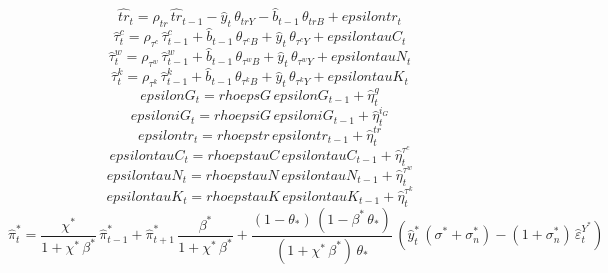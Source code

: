 \begin{dmath}
{\hat{tr}_{t}}={\rho_{tr}}\, {\hat{tr}_{t-1}}-{\hat{y}_{t}}\, {\theta_{trY}}-{\hat{b}_{t-1}}\, {\theta_{trB}}+{epsilontr_{t}}
\end{dmath}
\begin{dmath}
{\hat{\tau}^c_{t}}={\rho_{\tau^c}}\, {\hat{\tau}^c_{t-1}}+{\hat{b}_{t-1}}\, {\theta_{\tau^cB}}+{\hat{y}_{t}}\, {\theta_{\tau^cY}}+{epsilontauC_{t}}
\end{dmath}
\begin{dmath}
{\hat{\tau}^w_{t}}={\rho_{\tau^w}}\, {\hat{\tau}^w_{t-1}}+{\hat{b}_{t-1}}\, {\theta_{\tau^wB}}+{\hat{y}_{t}}\, {\theta_{\tau^wY}}+{epsilontauN_{t}}
\end{dmath}
\begin{dmath}
{\hat{\tau}^k_{t}}={\rho_{\tau^k}}\, {\hat{\tau}^k_{t-1}}+{\hat{b}_{t-1}}\, {\theta_{\tau^kB}}+{\hat{y}_{t}}\, {\theta_{\tau^kY}}+{epsilontauK_{t}}
\end{dmath}
\begin{dmath}
{epsilonG_{t}}={rhoepsG}\, {epsilonG_{t-1}}+{\hat{\eta}^{g}_{t}}
\end{dmath}
\begin{dmath}
{epsiloniG_{t}}={rhoepsiG}\, {epsiloniG_{t-1}}+{\hat{\eta}^{i_G}_{t}}
\end{dmath}
\begin{dmath}
{epsilontr_{t}}={rhoepstr}\, {epsilontr_{t-1}}+{\hat{\eta}^{tr}_{t}}
\end{dmath}
\begin{dmath}
{epsilontauC_{t}}={rhoepstauC}\, {epsilontauC_{t-1}}+{\hat{\eta}^{\tau^c}_{t}}
\end{dmath}
\begin{dmath}
{epsilontauN_{t}}={rhoepstauN}\, {epsilontauN_{t-1}}+{\hat{\eta}^{\tau^w}_{t}}
\end{dmath}
\begin{dmath}
{epsilontauK_{t}}={rhoepstauK}\, {epsilontauK_{t-1}}+{\hat{\eta}^{\tau^k}_{t}}
\end{dmath}
\begin{dmath}
{\hat{\pi}^*_{t}}=\frac{{\chi^*}}{1+{\chi^*}\, {\beta^*}}\, {\hat{\pi}^*_{t-1}}+{\hat{\pi}^*_{t+1}}\, \frac{{\beta^*}}{1+{\chi^*}\, {\beta^*}}+\frac{\left(1-{\theta_*}\right)\, \left(1-{\beta^*}\, {\theta_*}\right)}{\left(1+{\chi^*}\, {\beta^*}\right)\, {\theta_*}}\, \left({\hat{y}^*_{t}}\, \left({\sigma^*}+{\sigma^*_n}\right)-\left(1+{\sigma^*_n}\right)\, {\hat{\varepsilon}^{Y^*}_{t}}\right)
\end{dmath}
